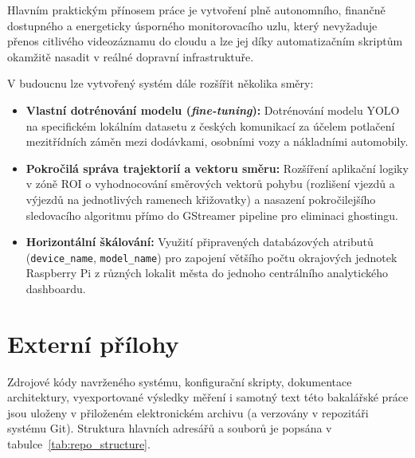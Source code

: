 \documentclass[male,czech,api_bc]{kitheses}
\begin{document}
Hlavním praktickým přínosem práce je vytvoření plně autonomního, finančně dostupného a energeticky úsporného monitorovacího uzlu, který nevyžaduje přenos citlivého videozáznamu do cloudu a lze jej díky automatizačním skriptům okamžitě nasadit v reálné dopravní infrastruktuře.


V budoucnu lze vytvořený systém dále rozšířit několika směry:
\begin{itemize}
    \item \textbf{Vlastní dotrénování modelu (\textit{fine-tuning}):} Dotrénování modelu YOLO na specifickém lokálním datasetu z českých komunikací za účelem potlačení mezitřídních záměn mezi dodávkami, osobními vozy a nákladními automobily.
    \item \textbf{Pokročilá správa trajektorií a vektoru směru:} Rozšíření aplikační logiky v zóně ROI o vyhodnocování směrových vektorů pohybu (rozlišení vjezdů a výjezdů na jednotlivých ramenech křižovatky) a nasazení pokročilejšího sledovacího algoritmu přímo do GStreamer pipeline pro eliminaci ghostingu.
    \item \textbf{Horizontální škálování:} Využití připravených databázových atributů (\texttt{device\_name}, \texttt{model\_name}) pro zapojení většího počtu okrajových jednotek Raspberry Pi z různých lokalit města do jednoho centrálního analytického dashboardu.
\end{itemize}

\sloppy
\printbibliography[title=Seznam použitých zdrojů]

\appendix

\chapter{Externí přílohy\label{sec:ep}}
Zdrojové kódy navrženého systému, konfigurační skripty, dokumentace architektury, vyexportované výsledky měření i samotný text této bakalářské práce jsou uloženy v přiloženém elektronickém archivu (a verzovány v repozitáři systému Git). Struktura hlavních adresářů a souborů je popsána v tabulce~\ref{tab:repo_structure}.
\end{document}
